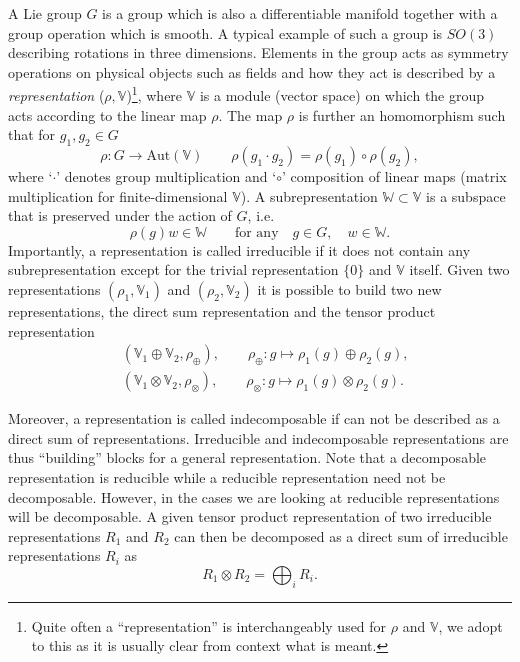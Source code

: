 A Lie group $G$ is a group which is also a differentiable manifold together with a group operation which is smooth. A typical example of such a group is $SO(3)$ describing rotations in three dimensions. Elements in the group acts as symmetry operations on physical objects such as fields and how they act is described by a \emph{representation} ($\rho,\mathbb{V}$)\footnote{Quite often a ``representation'' is interchangeably used for $\rho$ and $\mathbb{V}$, we adopt to this as it is usually clear from context what is meant.}, where $\mathbb{V}$ is a module (vector space) on which the group acts according to the linear map $\rho$. The map $\rho$ is further an homomorphism such that for $g_1,g_2\in G$
\begin{equation}
    \rho : G\to \text{Aut}(\mathbb{V}) \qquad \rho(g_1\cdot g_2) = \rho(g_1)\circ\rho(g_2),
\end{equation}
where `$\cdot$' denotes group multiplication and `$\circ$' composition of linear maps (matrix multiplication for finite-dimensional $\mathbb{V}$). A subrepresentation $\mathbb{W}\subset\mathbb{V}$ is a subspace that is preserved under the action of $G$, i.e.\
\begin{equation}
    \rho(g)w \in \mathbb{W} \qquad \text{for any} \quad g\in G,\quad w\in\mathbb{W}.
\end{equation}
Importantly, a representation is called irreducible if it does not contain any subrepresentation except for the trivial representation $\{0\}$ and $\mathbb{V}$ itself. Given two representations $(\rho_1,\mathbb{V}_1)$ and $(\rho_2,\mathbb{V}_2)$ it is possible to build two new representations, the direct sum representation and the tensor product representation
\begin{align}
    &(\mathbb{V}_1\oplus\mathbb{V}_2,\rho_{\oplus}),\qquad \rho_\oplus: g\mapsto \rho_1(g)\oplus\rho_2(g),\\
    &(\mathbb{V}_1\otimes\mathbb{V}_2,\rho_{\otimes}),\qquad \rho_\otimes: g\mapsto \rho_1(g)\otimes\rho_2(g).
\end{align}

Moreover, a representation is called indecomposable if can not be described as a direct sum of representations. Irreducible and indecomposable representations are thus ``building'' blocks for a general representation. Note that a decomposable representation is reducible while a reducible representation need not be decomposable. However, in the cases we are looking at reducible representations will be decomposable. A given tensor product representation of two irreducible representations $R_1$ and $R_2$ can then be decomposed as a direct sum of irreducible representations $R_i$ as
\begin{equation}
    R_1\otimes R_2 = \bigoplus_i R_i.
\end{equation}



